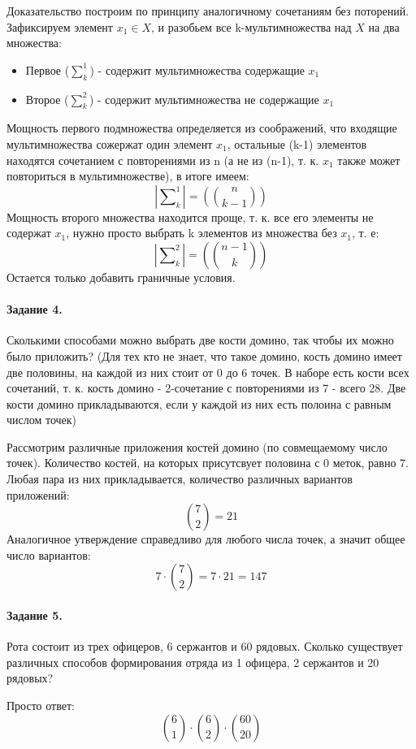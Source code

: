 \begin{Proof}
	Доказательство построим по принципу аналогичному сочетаниям без поторений. Зафиксируем элемент $x_1 \in X$, и разобьем все k-мультимножества над $X$ на два множества:

\begin{itemize}
	\item Первое ($\sum_k^1$) - содержит мультимножества содержащие $x_1$

	\item Второе ($\sum_k^2$) - содержит мультимножества не содержащие $x_1$
\end{itemize}

Мощность первого подмножества определяется из соображений, что входящие мультимножества сожержат один элемент $x_1$, остальные (k-1) элементов находятся сочетанием с повторениями из n (а не из (n-1), т. к. $x_1$ также может повториться в мультимножестве), в итоге имеем:
	\[
		\left| \sum\nolimits_k^1 \right| = \left( \binom{n}{k-1} \right)
	\]
Мощность второго множества находится проще, т. к. все его элементы не содержат $x_1$, нужно просто выбрать k элементов из множества без $x_1$, т. е:
	\[
		\left| \sum\nolimits_k^2 \right| = \left( \binom{n-1}{k} \right)
	\]
Остается только добавить граничные условия.

\end{Proof}

\paragraph{Задание 4.} Сколькими способами можно выбрать две кости домино, так чтобы их можно было приложить? (Для тех кто не знает, что такое домино, кость домино имеет две половины, на каждой из них стоит от 0 до 6 точек. В наборе есть кости всех сочетаний, т. к. кость домино - 2-сочетание с повторениями из 7 - всего 28. Две кости домино прикладываются, если у каждой из них есть полоина с равным числом точек)

\begin{Solution}
	Рассмотрим различные приложения костей домино (по совмещаемому число точек). Количество костей, на которых присутсвует половина с 0 меток, равно 7. Любая пара из них прикладывается, количество различных вариантов приложений: \[ \binom{7}{2} = 21 \] Аналогичное утверждение справедливо для любого числа точек, а значит общее число вариантов: \[ 7 \cdot \binom{7}{2} = 7 \cdot 21 = 147 \]
\end{Solution}

\paragraph{Задание 5.} Рота состоит из трех офицеров, 6 сержантов и 60 рядовых. Сколько существует различных способов формирования отряда из 1 офицера, 2 сержантов и 20 рядовых?

\begin{Solution}
	Просто ответ: \[ \binom{6}{1} \cdot \binom{6}{2} \cdot \binom{60}{20} \]
\end{Solution}
